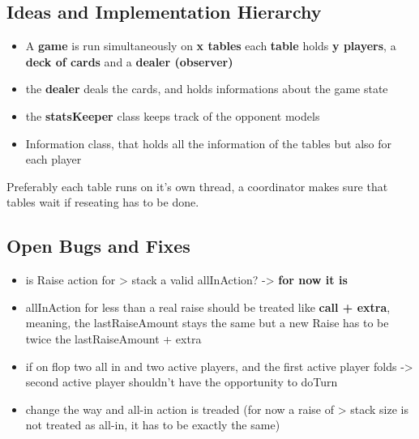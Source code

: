 \subsection{Ideas and Implementation Hierarchy}
\begin{itemize}
\item A \textbf{game} is run simultaneously  on \textbf{x tables}
\subitem each \textbf{table} holds \textbf{y players}, a \textbf{deck of cards} and a \textbf{dealer (observer)}
\item the \textbf{dealer} deals the cards, and holds informations about the game state
\item the \textbf{statsKeeper} class keeps track of the opponent models
\item Information class, that holds all the information of the tables but also for each player
\end{itemize}
Preferably each table runs on it's own thread, a coordinator makes sure that tables wait if reseating has to be done.
\subsection{Open Bugs and Fixes}
\begin{itemize}
\item is Raise action for > stack a valid allInAction? -> \textbf{for now it is}
\item allInAction for less than a real raise should be treated like \textbf{call + extra}, meaning, the lastRaiseAmount stays the same but a new Raise has to be twice the lastRaiseAmount + extra
\item if on flop two all in and two active players, and the first active player folds -> second active player shouldn't have the opportunity to doTurn
\item change the way and all-in action is treaded (for now a raise of > stack size is not treated as all-in, it has to be exactly the same)
\end{itemize}

